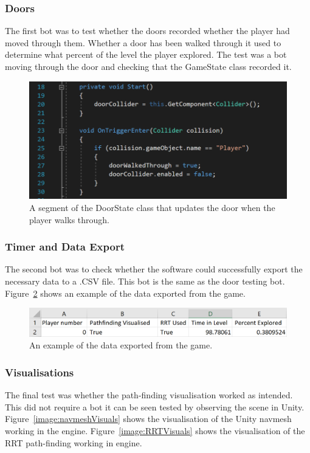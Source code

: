 \documentclass[journal]{IEEEtran}
\begin{document}
	\subsubsection{Doors}
	The first bot was to test whether the doors recorded whether the player had moved through them. Whether a door has been walked through it used to determine what percent of the level the player explored.
	The test was a bot moving through the door and checking that the GameState class recorded it.
	
	
	\begin{figure}[h]
		\includegraphics[width=1.0\linewidth]{DoorCode.png}
		\caption{A segment of the DoorState class that updates the door when the player walks through.}
		\label{image:DoorCode}
	\end{figure} 
	
	\subsubsection{Timer and Data Export}
	The second bot was to check whether the software could successfully export the necessary data to a .CSV file. This bot is the same as the door testing bot. Figure~\ref{image:ExportData} shows an example of the data exported from the game.  
	
	\begin{figure}[h]
		\includegraphics[width=1.0\linewidth]{ExportData.png}
		\caption{An example of the data exported from the game.}
		\label{image:ExportData}
	\end{figure} 
	
	\subsubsection{Visualisations}
	The final test was whether the path-finding visualisation worked as intended. This did not require a bot it can be seen tested by observing the scene in Unity. Figure~\ref{image:navmeshVisuals} shows the visualisation of the Unity navmesh working in the engine.  Figure~\ref{image:RRTVisuals} shows the visualisation of the RRT path-finding working in engine.
	
\end{document}
